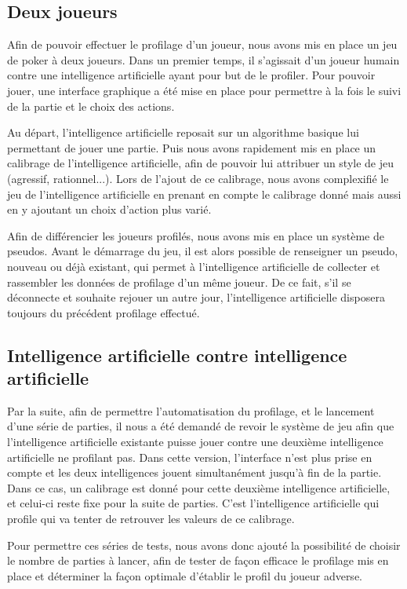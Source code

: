 \documentclass{report}
\begin{document}
\subsection{Deux joueurs}
\hspace{0.5cm}Afin de pouvoir effectuer le profilage d'un joueur, nous avons mis en place un jeu de poker à deux joueurs. Dans un premier temps, il s'agissait d'un joueur humain contre une intelligence artificielle ayant pour but de le profiler. Pour pouvoir jouer, une interface graphique a été mise en place pour permettre à la fois le suivi de la partie et le choix des actions.\par
Au départ, l'intelligence artificielle reposait sur un algorithme basique lui permettant de jouer une partie. Puis nous avons rapidement mis en place un calibrage de l'intelligence artificielle, afin de pouvoir lui attribuer un style de jeu (agressif, rationnel...). Lors de l'ajout de ce calibrage, nous avons complexifié le jeu de l'intelligence artificielle en prenant en compte le calibrage donné mais aussi en y ajoutant un choix d'action plus varié.\par
Afin de différencier les joueurs profilés, nous avons mis en place un système de pseudos. Avant le démarrage du jeu, il est alors possible de renseigner un pseudo, nouveau ou déjà existant, qui permet à l'intelligence artificielle de collecter et rassembler les données de profilage d'un même joueur. De ce fait, s'il se déconnecte et souhaite rejouer un autre jour, l'intelligence artificielle disposera toujours du précédent profilage effectué.\par

\subsection{Intelligence artificielle contre intelligence artificielle}
\hspace{0.5cm}Par la suite, afin de permettre l'automatisation du profilage, et le lancement d'une série de parties, il nous a été demandé de revoir le système de jeu afin que l'intelligence artificielle existante puisse jouer contre une deuxième intelligence artificielle ne profilant pas. Dans cette version, l'interface n'est plus prise en compte et les deux intelligences jouent simultanément jusqu'à fin de la partie. Dans ce cas, un calibrage est donné pour cette deuxième intelligence artificielle, et celui-ci reste fixe pour la suite de parties. C'est l'intelligence artificielle qui profile qui va tenter de retrouver les valeurs de ce calibrage.\par
Pour permettre ces séries de tests, nous avons donc ajouté la possibilité de choisir le nombre de parties à lancer, afin de tester de façon efficace le profilage mis en place et déterminer la façon optimale d'établir le profil du joueur adverse.\par
\end{document}
